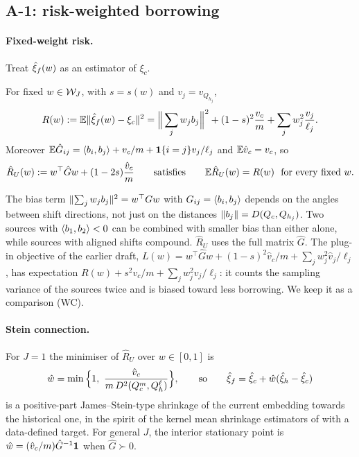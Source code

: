 \documentclass[11pt,a4paper]{article}
\begin{document}
\subsection{A-1: risk-weighted borrowing}\label{sec:weights}

\paragraph{Fixed-weight risk.} Treat $\hat\xi_f(w)$ as an estimator of $\xi_c$.

\begin{proposition}\label{prop:risk}
For fixed $w\in\mathcal{W}_J$, with $s=s(w)$ and $v_j=v_{Q_{h_j}}$,
\[
R(w):=\mathbb{E}\lVert \hat\xi_f(w)-\xi_c\rVert^2=\Big\|\sum_jw_jb_j\Big\|^2+(1-s)^2\frac{v_c}{m}+\sum_jw_j^2\frac{v_j}{\ell_j}.
\]
Moreover $\mathbb{E}\hat G_{ij}=\langle b_i, b_j\rangle+v_c/m+\mathbf{1}\{i=j\}v_j/\ell_j$ and $\mathbb{E}\hat v_c=v_c$, so
\begin{equation}\label{eq:RU}
\hat R_U(w):=w^\top\hat Gw+(1-2s)\frac{\hat v_c}{m}\qquad\text{satisfies}\qquad \mathbb{E}\hat R_U(w)=R(w)\ \text{ for every fixed } w.
\end{equation}
\end{proposition}

The bias term $\lVert \sum_jw_jb_j\rVert^2=w^\top Gw$ with $G_{ij}=\langle b_i, b_j\rangle$ depends on the angles between shift directions, not just on the distances $\lVert b_j\rVert=D(Q_c,Q_{h_j})$. Two sources with $\langle b_1, b_2\rangle<0$ can be combined with smaller bias than either alone, while sources with aligned shifts compound. $\hat R_U$ uses the full matrix $\hat G$. The plug-in objective of the earlier draft, $L(w)=w^\top\hat Gw+(1-s)^2\hat v_c/m+\sum_jw_j^2\hat v_j/\ell_j$, has expectation $R(w)+s^2v_c/m+\sum_jw_j^2v_j/\ell_j$: it counts the sampling variance of the sources twice and is biased toward less borrowing. We keep it as a comparison (WC).

\paragraph{Stein connection.} For $J=1$ the minimiser of $\hat R_U$ over $w\in[0,1]$ is
\[
\hat w=\min\Big\{1,\ \frac{\hat v_c}{m\,D^2(Q_c^m,Q_h^\ell)}\Big\},\qquad\text{so}\qquad \hat\xi_f=\hat\xi_c+\hat w(\hat\xi_h-\hat\xi_c)
\]
is a positive-part James--Stein-type shrinkage of the current embedding towards the historical one, in the spirit of the kernel mean shrinkage estimators of \citet{muandet2016} with a data-defined target. For general $J$, the interior stationary point is $\hat w=(\hat v_c/m)\hat G^{-1}\mathbf{1}$ when $\hat G\succ0$.
\end{document}
